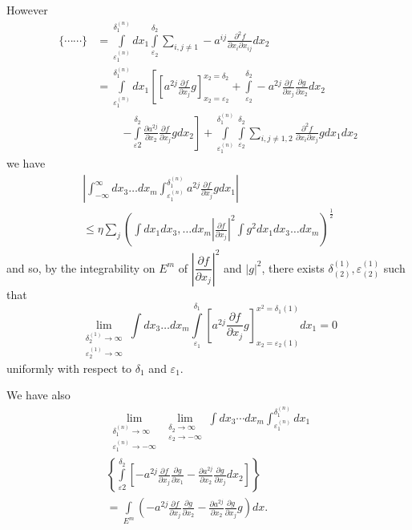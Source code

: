 However\pageoriginale 
\begin{align*}
  \Big\{ \cdots \cdots \Big\} & =
  \int\limits^{\delta^{(n)}_{1}}_{ \varepsilon^{(n)}_1}
  dx_1 \int\limits_{\varepsilon_2}^{\delta_2} \sum_{i, j \neq 1}
  -a^{ij} \frac{\partial^2 f}{\partial x_i \partial x_{ij}} dx_2\\ 
  & = \int\limits^{\delta_1^{(n)}}_{\varepsilon_1^{(n)}} dx_1 \left[ \left[ a^{2j}
      \frac{\partial f}{\partial x_j} g \right]^{x_2=
          \delta_2}_{x_2=\varepsilon_2}+ \int\limits^{\delta_2}_{\varepsilon_2} -a^{2j}
    \frac{\partial f}{\partial x_j} \frac{\partial g}{\partial x_2}
    dx_2\right.\\
    &\hspace{1cm}\left.-\int\limits_{\varepsilon 2}^{\delta_ 2} \frac{\partial a^{2j}
    }{\partial x_2} \frac{\partial f}{\partial x_j}  g dx_2\right] 
  + \int\limits^{\delta^{(n)}_1}_{\varepsilon^{(n)}_1}
  \int\limits_{\varepsilon_2}^{\delta_2} \sum_{ i, j \neq 1, 2
  }\frac{\partial^2 f}{\partial x_i \partial x_j} g dx_1
  dx_2 
\end{align*} 
we have 
\begin{multline*}
  \left| \int^{\infty}_{-\infty} dx_3 \ldots dx_m \int^{ \delta_1
 ^{(n)}}_{\varepsilon^{(n)}_1} a^{2j} \frac{\partial
  f}{\partial x_j} g dx_1\right| \\ 
 \leq \eta \sum_j \left(\int dx_1 dx_3, \ldots dx_m \left|\frac{\partial
  f}{\partial x_j}\right|^2 \int g^2 dx_1 dx_3 \ldots dx_m \right)^{\frac{1}{2}}  
\end{multline*}
and so, by the integrability on $E^m$ of $\left|\dfrac{\partial
 f}{\partial x_j}\right|^2$ and $|g|^2$, there exists $\delta^{(1)}_{(2)},
\varepsilon^{(1)}_{(2)} $ such that 
$$
\lim_{\substack {\delta^{(1)}_2 \to \infty \\ \varepsilon^{(1)}_2 \to
  \infty}}\int dx_3 \ldots dx_m
\int\limits_{\varepsilon_1}^{\delta_1} \left[ a^{2j} \frac{\partial
  f}{\partial x_j}g\right]^{x^2 = \delta_1 (1)}_{x_2 = \varepsilon_2
 (1)} dx_1 = 0 
$$
uniformly with respect to $\delta_1$ and $\varepsilon_1$. 

We have also 
\begin{multline*}
 \lim\limits_ {\substack{\delta^{(n)}_1 \to
     \infty\\{\varepsilon^{(n)}_1 \to
    -\infty}}}\lim\limits_{\substack{\delta_2\to \infty\\{\varepsilon_2\to
    -\infty}}} \int dx_3 \cdots dx_m \int
^{\delta^{(n)}_1}_{\varepsilon^{(n)}_1}dx_1\\ 
 \left\{ \int \limits
^{\delta_2}_{\varepsilon 2} \left[-a^{2j}\frac{\partial f}{\partial
   x_j} \frac{\partial g}{\partial x_1}-\frac{\partial
  a^{2j}}{\partial x_2} \frac{\partial g}{\partial x_j} dx_2\right]
 \right\}\\ 
 = \int \limits_{E^m} \left(-a^{2j}\frac{\partial f}{\partial
  x_j}\frac{\partial g}{\partial x_2}-\frac{\partial
  a^{2j}}{\partial x_2} \frac{\partial g}{\partial x_j} g\right)dx. 
\end{multline*}

